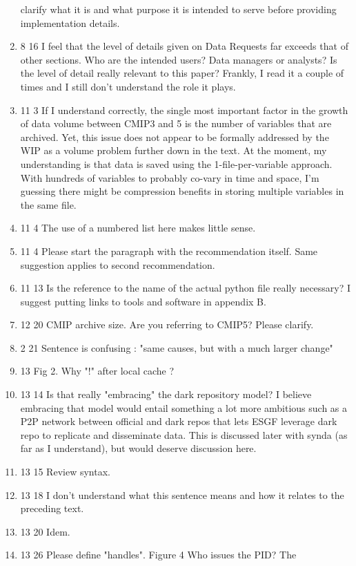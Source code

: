 \documentclass[gmd,manuscript]{copernicus}
\begin{document}
\begin{enumerate}[label=RC2-\arabic*,leftmargin=*]
  clarify what it is and what purpose it is intended to serve before
  providing implementation details.
\item 8 16 I feel that the level of details given on Data Requests far
  exceeds that of other sections. Who are the intended users? Data
  managers or analysts? Is the level of detail really relevant to this
  paper? Frankly, I read it a couple of times and I still don’t
  understand the role it plays.
\item 11 3 If I understand correctly, the single most important factor
  in the growth of data volume between CMIP3 and 5 is the number of
  variables that are archived. Yet, this issue does not appear to be
  formally addressed by the WIP as a volume problem further down in
  the text. At the moment, my understanding is that data is saved
  using the 1-file-per-variable approach. With hundreds of variables
  to probably co-vary in time and space, I’m guessing there might be
  compression benefits in storing multiple variables in the same file.
\item 11 4 The use of a numbered list here makes little sense.
\item 11 4 Please start the paragraph with the recommendation itself.
  Same suggestion applies to second recommendation.
\item 11 13 Is the reference to the name of the actual python file
  really necessary? I suggest putting links to tools and software in
  appendix B.
\item 12 20 CMIP archive size. Are you referring to CMIP5? Please
  clarify.
\item 2 21 Sentence is confusing : "same causes, but with a much
  larger change"
\item 13 Fig 2. Why "!" after local cache ?
\item 13 14 Is that really "embracing" the dark repository model? I
  believe embracing that model would entail something a lot more
  ambitious such as a P2P network between official and dark repos that
  lets ESGF leverage dark repo to replicate and disseminate data. This
  is discussed later with synda (as far as I understand), but would
  deserve discussion here.
\item 13 15 Review syntax.
\item 13 18 I don’t understand what this sentence means and how it
  relates to the preceding text.
\item 13 20 Idem.
\item 13 26 Please define "handles". Figure 4 Who issues the PID? The

\end{enumerate}
\end{document}
